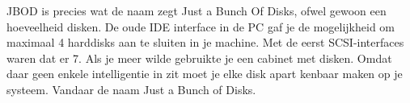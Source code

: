JBOD is precies wat de naam zegt Just a Bunch Of Disks, ofwel gewoon een hoeveelheid disken. De oude IDE interface in de PC gaf je de mogelijkheid om maximaal 4 harddisks aan te sluiten in je machine. Met de eerst SCSI-interfaces waren dat er 7. Als je meer wilde gebruikte je een cabinet met disken. Omdat daar geen enkele intelligentie in zit moet je elke disk apart kenbaar maken op je systeem. Vandaar de naam Just a Bunch of Disks.
